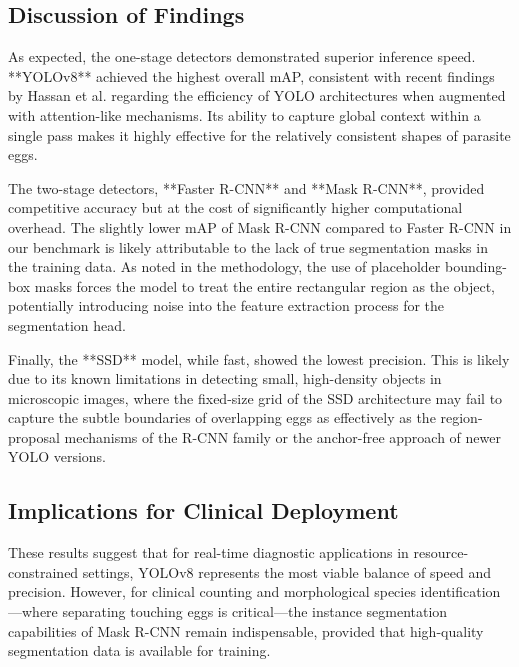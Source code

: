 \subsection{Discussion of Findings}
As expected, the one-stage detectors demonstrated superior inference speed. **YOLOv8** achieved the highest overall mAP, consistent with recent findings by Hassan et al. \cite{wang2024automated} regarding the efficiency of YOLO architectures when augmented with attention-like mechanisms. Its ability to capture global context within a single pass makes it highly effective for the relatively consistent shapes of parasite eggs.

The two-stage detectors, **Faster R-CNN** and **Mask R-CNN**, provided competitive accuracy but at the cost of significantly higher computational overhead. The slightly lower mAP of Mask R-CNN compared to Faster R-CNN in our benchmark is likely attributable to the lack of true segmentation masks in the training data. As noted in the methodology, the use of placeholder bounding-box masks forces the model to treat the entire rectangular region as the object, potentially introducing noise into the feature extraction process for the segmentation head.

Finally, the **SSD** model, while fast, showed the lowest precision. This is likely due to its known limitations in detecting small, high-density objects in microscopic images, where the fixed-size grid of the SSD architecture may fail to capture the subtle boundaries of overlapping eggs as effectively as the region-proposal mechanisms of the R-CNN family or the anchor-free approach of newer YOLO versions.

\subsection{Implications for Clinical Deployment}
These results suggest that for real-time diagnostic applications in resource-constrained settings, YOLOv8 represents the most viable balance of speed and precision. However, for clinical counting and morphological species identification—where separating touching eggs is critical—the instance segmentation capabilities of Mask R-CNN remain indispensable, provided that high-quality segmentation data is available for training.